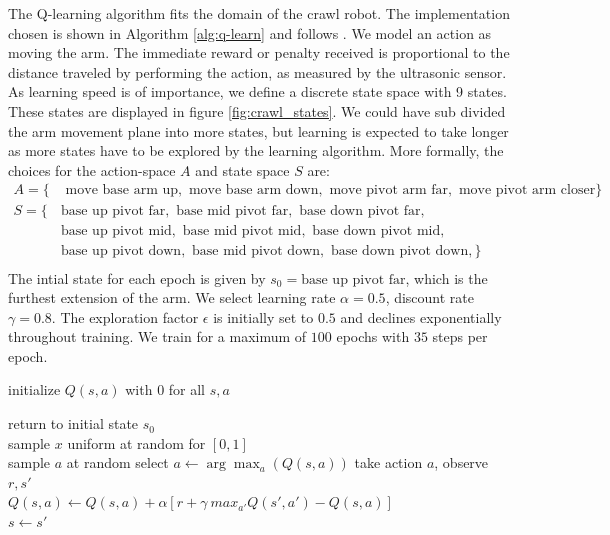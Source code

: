 \documentclass[11pt, a4paper]{article}
\begin{document}
The Q-learning algorithm fits the domain of the crawl robot. The implementation chosen is shown in Algorithm \ref{alg:q-learn} and follows \cite{sutton1998introduction}. We model an action as moving the arm. The immediate reward or penalty received is proportional to the distance traveled by performing the action, as measured by the ultrasonic sensor. As learning speed is of importance, we define a discrete state space with 9 states. These states are displayed in figure \ref{fig:crawl_states}. We could have sub divided the arm movement plane into more states, but learning is expected to take longer as more states have to be explored by the learning algorithm. More formally, the choices for the action-space $A$ and state space $S$ are:
\begin{align*}
	A = \{ &\text{ move base arm up}, \text{ move base arm down} , \text{ move pivot arm far}, \text{ move pivot arm closer}\} \\
	S = \{ &\text{base up pivot far}, \text{ base mid pivot far}, \text{ base down pivot far}, \\
	       &\text{base up pivot mid}, \text{ base mid pivot mid}, \text{ base down pivot mid},\\
	       &\text{base up pivot down}, \text{ base mid pivot down}, \text{ base down pivot down},\} \\
\end{align*}
The intial state for each epoch is given by $s_0 = \text{base up pivot far}$, which is the furthest extension of the arm. We select learning rate $\alpha = 0.5$, discount rate $\gamma = 0.8$. The exploration factor $\epsilon$ is initially set to $0.5$ and declines exponentially throughout training. We train for a maximum of $100$ epochs with $35$ steps per epoch.
\begin{algorithm}[]
	
	\Input{learning rate $\alpha \in ]0,1]$, discount rate $\gamma \in [0,1[$}
	initialize $Q(s, a)$ with $0$ for all $s,a$\\
	{
		return to initial state $s_0$ \\
		{
			sample $x$ uniform at random for $[0,1]$ \\
			{sample $a$ at random}
			{select $a \leftarrow \arg \max_a(Q(s,a))$}	
			take action $a$, observe $r, s'$ \\
			$Q(s,a) \leftarrow Q(s,a) + \alpha [r + \gamma \  max_{a'} Q(s', a') - Q(s,a)]$ \\
			$s \leftarrow s'$
		}
		
	}
	\caption{Q-learning with $\epsilon$-greedy exploration}
	\label{alg:q-learn}
\end{algorithm}
\end{document}
